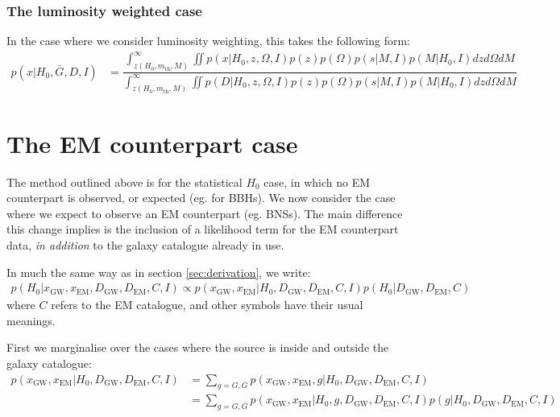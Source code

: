 \documentclass[a4paper,10pt]{article}
\begin{document}
\subsubsection{The luminosity weighted case}
In the case where we consider luminosity weighting, this takes the following form:
\begin{equation}
\begin{aligned}
p(x|H_0,\bar{G},D,I) &= \dfrac{\int^\infty_{z(H_0,m_{\text{th}},M)} \iint p(x|H_0,z,\Omega,I) p(z) p(\Omega) p(s|M,I) p(M|H_0,I) dz d\Omega dM}{\int^\infty_{z(H_0,m_{\text{th}},M)} \iint p(D|H_0,z,\Omega,I) p(z) p(\Omega) p(s|M,I) p(M|H_0,I) dz d\Omega dM}
\end{aligned}
\end{equation}





\section{The EM counterpart case}
The method outlined above is for the statistical $H_0$ case, in which no EM counterpart is observed, or expected (eg. for BBHs).  We now consider the case where we expect to observe an EM counterpart (eg. BNSs).  The main difference this change implies is the inclusion of a likelihood term for the EM counterpart data, \emph{in addition} to the galaxy catalogue already in use.

In much the same way as in section \ref{sec:derivation}, we write:
\begin{equation}
\begin{aligned}
p(H_0|x_{\text{GW}},x_{\text{EM}},D_{\text{GW}},D_{\text{EM}},C,I) \propto p(x_{\text{GW}},x_{\text{EM}}|H_0,D_{\text{GW}},D_{\text{EM}},C,I) p(H_0|D_{\text{GW}},D_{\text{EM}},C)
\end{aligned} 
\end{equation}
where $C$ refers to the EM catalogue, and other symbols have their usual meanings.

First we marginalise over the cases where the source is inside and outside the galaxy catalogue:
\begin{equation}
\begin{aligned}
p(x_{\text{GW}},x_{\text{EM}}|H_0,D_{\text{GW}},D_{\text{EM}},C,I) &= \sum_{g=G,\bar{G}} p(x_{\text{GW}},x_{\text{EM}},g|H_0,D_{\text{GW}},D_{\text{EM}},C,I)
\\ &= \sum_{g=G,\bar{G}} p(x_{\text{GW}},x_{\text{EM}}|H_0,g,D_{\text{GW}},D_{\text{EM}},C,I) p(g|H_0,D_{\text{GW}},D_{\text{EM}},C,I)
\end{aligned} 
\end{equation}
\end{document}
